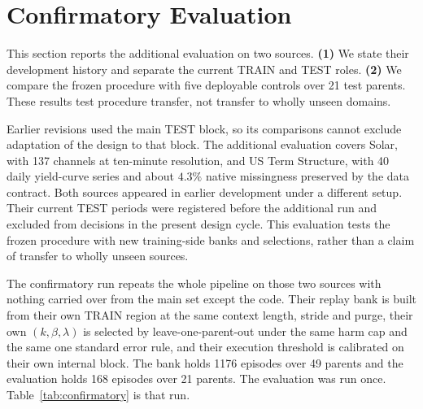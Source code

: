 \documentclass{article}
\begin{document}
\section{Confirmatory Evaluation}
\label{app:confirmatory}

This section reports the additional evaluation on two sources. \textbf{(1)} We state their development history and separate the current TRAIN and TEST roles. \textbf{(2)} We compare the frozen procedure with five deployable controls over 21 test parents. These results test procedure transfer, not transfer to wholly unseen domains.

Earlier revisions used the main TEST block, so its comparisons cannot exclude adaptation
of the design to that block. The additional evaluation covers Solar, with 137 channels at
ten-minute resolution, and US Term Structure, with 40 daily yield-curve series and about
$4.3\%$ native missingness preserved by the data contract. Both sources appeared in earlier
development under a different setup. Their current TEST periods were registered before
the additional run and excluded from decisions in the present design cycle. This evaluation
tests the frozen procedure with new training-side banks and selections, rather than a claim
of transfer to wholly unseen sources.

The confirmatory run repeats the whole pipeline on those two sources with nothing carried over
from the main set except the code. Their replay bank is built from their own TRAIN region at
the same context length, stride and purge, their own $(k,\beta,\lambda)$ is selected by
leave-one-parent-out under the same harm cap and the same one standard error rule, and their
execution threshold is calibrated on their own internal block. The bank holds 1176 episodes
over 49 parents and the evaluation holds 168 episodes over 21 parents. The evaluation was run
once. Table~\ref{tab:confirmatory} is that run.
\end{document}
